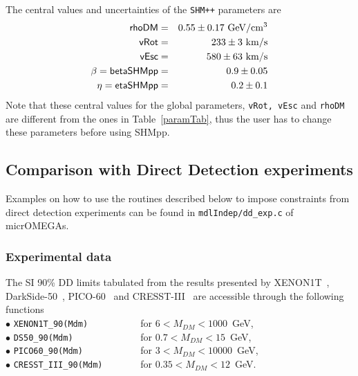 \documentclass[12pt,a4paper]{article}
\begin{document}
The central values  and uncertainties   of   the {\tt SHM++} parameters are  
\begin{eqnarray}
\nonumber 
\textsf{rhoDM} &=&0.55\pm 0.17 ~{\rm GeV}/{\rm cm}^3\\
\nonumber
\textsf{vRot}&=& 233\pm 3 ~{\rm km/s}\\
\nonumber
\textsf{vEsc}&=& 580\pm 63~ {\rm km/s}\\
\nonumber
 \beta=\textsf{betaSHMpp} &=&0.9\pm 0.05\\
\eta= \textsf{etaSHMpp} &=& 0.2\pm 0.1 
\label{eq:SHMpp} 
\end{eqnarray}
\noindent
Note that these central values for the global parameters, {\tt vRot, vEsc} and {\tt rhoDM}   
are different from  the  ones in Table~\ref{paramTab}, thus the user has  to change these parameters before  using SHMpp.
 






\subsection{Comparison with Direct Detection experiments} 
\label{DDexp}

Examples on how to use the routines described below to impose constraints from direct detection experiments  can be found  in \verb|mdlIndep/dd_exp.c| of micrOMEGAs. 
\subsubsection{Experimental data}

The SI 90\%  DD  limits  tabulated from the results presented by  XENON1T~\cite{Aprile:2018dbl}, DarkSide-50~\cite{Agnes:2018ves}, PICO-60~\cite{Amole:2019fdf}  and CRESST-III~\cite{Abdelhameed:2019hmk}  are accessible through  the following functions \\

\noindent
$\bullet$ \verb|XENON1T_90(Mdm)          | for  $ 6 <  M_{DM} < 1000$~GeV, \cite{Aprile:2018dbl}  \\
\noindent
$\bullet$ \verb|DS50_90(Mdm)             | for  $ 0.7 < M_{DM} < 15$~GeV, \cite{Agnes:2018ves}   \\
\noindent
$\bullet$ \verb|PICO60_90(Mdm)           | for  $ 3 < M_{DM} < 10000$~GeV, \cite{Amole:2019fdf}   \\
\noindent
$\bullet$ \verb|CRESST_III_90(Mdm)       |  for $ 0.35 < M_{DM} < 12$~GeV. \cite{Abdelhameed:2019hmk} \\
\end{document}
